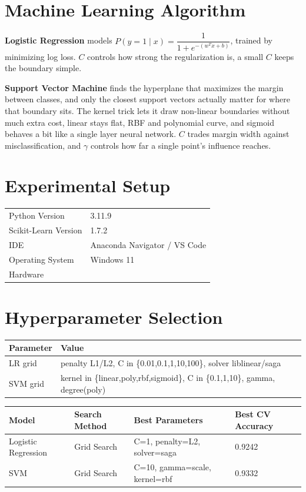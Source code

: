 \documentclass[12pt,a4paper]{article}
\begin{document}
\section{Machine Learning Algorithm}

\textbf{Logistic Regression} models $P(y=1\mid x) = \dfrac{1}{1+e^{-(w^Tx+b)}}$, trained by minimizing
log loss. $C$ controls how strong the regularization is, a small $C$ keeps the boundary simple.

\textbf{Support Vector Machine} finds the hyperplane that maximizes the margin between classes, and
only the closest support vectors actually matter for where that boundary sits. The kernel trick lets
it draw non-linear boundaries without much extra cost, linear stays flat, RBF and polynomial curve,
and sigmoid behaves a bit like a single layer neural network. $C$ trades margin width against
misclassification, and $\gamma$ controls how far a single point's influence reaches.

\section{Experimental Setup}
\begin{tabular}{ll}
\toprule
Python Version & 3.11.9 \\
Scikit-Learn Version & 1.7.2 \\
IDE & Anaconda Navigator / VS Code \\
Operating System & Windows 11 \\
Hardware & \\
\bottomrule
\end{tabular}

\section{Hyperparameter Selection}
\begin{tabular}{ll}
\toprule
Parameter & Value\\
\midrule
LR grid & penalty L1/L2, C in \{0.01,0.1,1,10,100\}, solver liblinear/saga \\
SVM grid & kernel in \{linear,poly,rbf,sigmoid\}, C in \{0.1,1,10\}, gamma, degree(poly) \\
\bottomrule
\end{tabular}

\vspace{0.3cm}
\begin{tabular}{p{3.2cm}p{2.4cm}p{5.6cm}p{2.5cm}}
\toprule
Model & Search Method & Best Parameters & Best CV Accuracy \\
\midrule
Logistic Regression & Grid Search & C=1, penalty=L2, solver=saga & 0.9242 \\
SVM & Grid Search & C=10, gamma=scale, kernel=rbf & 0.9332 \\
\bottomrule
\end{tabular}
\end{document}
